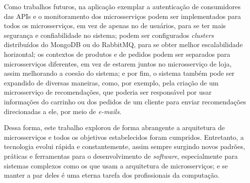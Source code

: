 Como trabalhos futuros, na aplicação exemplar a autenticação de consumidores das APIs e o monitoramento dos microsserviços podem ser implementados para todos os microsserviços, em vez de apenas no de usuários, para se ter mais segurança e confiabilidade no sistema; podem ser configurados \emph{clusters} distribuídos do MongoDB ou do RabbitMQ, para se obter melhor escalabilidade horizontal; os contextos de produtos e de pedidos podem ser separados para microsserviços diferentes, em vez de estarem juntos no microsserviço de loja, assim melhorando a coesão do sistema; e por fim, o sistema também pode ser expandido de diversas maneiras, como, por exemplo, pela criação de um microsserviço de recomendações, 
que poderia ser responsável por usar informações do carrinho ou dos pedidos de um cliente para enviar recomendações direcionadas a ele, por meio de \emph{e-mails}.


Dessa forma, este trabalho explorou de forma abrangente a arquitetura de microsserviços e todos os objetivos estabelecidos foram cumpridos. Entretanto, a tecnologia evolui rápida e constantemente, assim sempre surgindo novos padrões, práticas e ferramentas para o desenvolvimento de \emph{software}, especialmente para sistemas complexos como os que usam a arquitetura de microsserviços; e se manter a par deles é uma eterna tarefa dos profissionais da computação.



